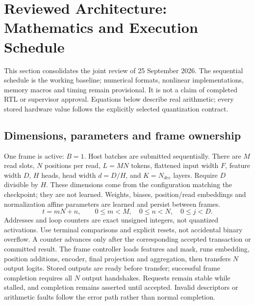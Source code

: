 \section{Reviewed Architecture: Mathematics and Execution Schedule}
This section consolidates the joint review of 25 September 2026. The sequential schedule is the working baseline; numerical formats, nonlinear implementations, memory macros and timing remain provisional. It is not a claim of completed RTL or supervisor approval. Equations below describe real arithmetic; every stored hardware value follows the explicitly selected quantization contract.

\subsection{Dimensions, parameters and frame ownership}
One frame is active: $B=1$. Host batches are submitted sequentially. There are $M$ read slots, $N$ positions per read, $L=MN$ tokens, flattened input width $F$, feature width $D$, $H$ heads, head width $d=D/H$, and $K=N_{dec}$ layers. Require $D$ divisible by $H$. These dimensions come from the configuration matching the checkpoint; they are not learned. Weights, biases, position/read embeddings and normalization affine parameters are learned and persist between frames.
\[
t=mN+n,\qquad 0\leq m<M,\quad 0\leq n<N,\quad 0\leq j<D.
\]
Addresses and loop counters are exact unsigned integers, not quantized activations. Use terminal comparisons and explicit resets, not accidental binary overflow. A counter advances only after the corresponding accepted transaction or committed result.
The frame controller loads features and mask, runs embedding, position additions, encoder, final projection and aggregation, then transfers $N$ output logits. Stored outputs are ready before transfer; successful frame completion requires all $N$ output handshakes. Requests remain stable while stalled, and completion remains asserted until accepted. Invalid descriptors or arithmetic faults follow the error path rather than normal completion.

